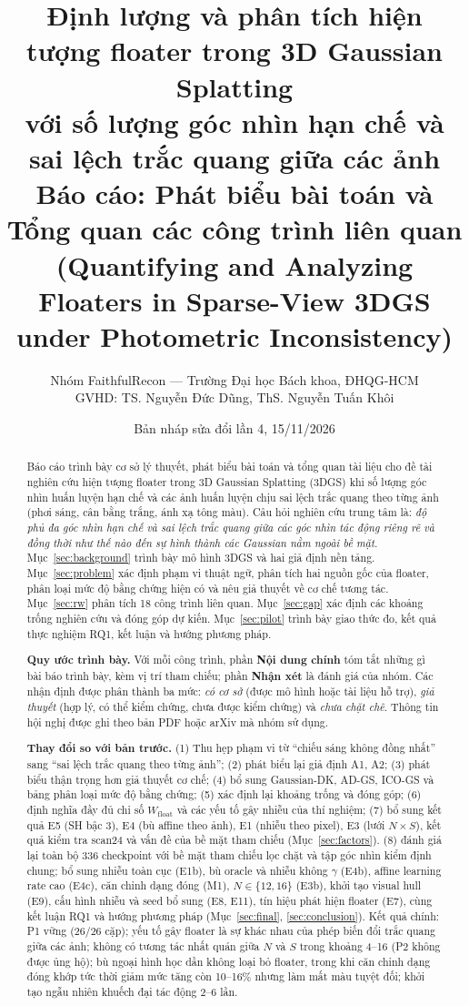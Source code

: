 \documentclass[11pt,a4paper]{article}
\title{\textbf{Định lượng và phân tích hiện tượng floater trong 3D Gaussian Splatting\\với số lượng góc nhìn hạn chế và sai lệch trắc quang giữa các ảnh}\\[4pt]
\large Báo cáo: Phát biểu bài toán và Tổng quan các công trình liên quan\\
\normalsize (Quantifying and Analyzing Floaters in Sparse-View 3DGS under Photometric Inconsistency)}
\author{Nhóm FaithfulRecon --- Trường Đại học Bách khoa, ĐHQG-HCM\\
GVHD: TS. Nguyễn Đức Dũng, ThS. Nguyễn Tuấn Khôi}
\date{Bản nháp sửa đổi lần 4, 15/11/2026}
\begin{document}
\maketitle

\begin{abstract}
\noindent Báo cáo trình bày cơ sở lý thuyết, phát biểu bài toán và tổng quan tài liệu cho đề tài nghiên cứu hiện tượng floater trong 3D Gaussian Splatting (3DGS) khi số lượng góc nhìn huấn luyện hạn chế và các ảnh huấn luyện chịu sai lệch trắc quang theo từng ảnh (phơi sáng, cân bằng trắng, ánh xạ tông màu). Câu hỏi nghiên cứu trung tâm là: \emph{độ phủ đa góc nhìn hạn chế và sai lệch trắc quang giữa các góc nhìn tác động riêng rẽ và đồng thời như thế nào đến sự hình thành các Gaussian nằm ngoài bề mặt.} Mục~\ref{sec:background} trình bày mô hình 3DGS và hai giả định nền tảng. Mục~\ref{sec:problem} xác định phạm vi thuật ngữ, phân tích hai nguồn gốc của floater, phân loại mức độ bằng chứng hiện có và nêu giả thuyết về cơ chế tương tác. Mục~\ref{sec:rw} phân tích 18 công trình liên quan. Mục~\ref{sec:gap} xác định các khoảng trống nghiên cứu và đóng góp dự kiến. Mục~\ref{sec:pilot} trình bày giao thức đo, kết quả thực nghiệm RQ1, kết luận và hướng phương pháp.

\smallskip\noindent\textbf{Quy ước trình bày.} Với mỗi công trình, phần \textcolor{paper}{\textbf{Nội dung chính}} tóm tắt những gì bài báo trình bày, kèm vị trí tham chiếu; phần \textcolor{nhom}{\textbf{Nhận xét}} là đánh giá của nhóm. Các nhận định được phân thành ba mức: \emph{có cơ sở} (được mô hình hoặc tài liệu hỗ trợ), \emph{giả thuyết} (hợp lý, có thể kiểm chứng, chưa được kiểm chứng) và \emph{chưa chặt chẽ}. Thông tin hội nghị được ghi theo bản PDF hoặc arXiv mà nhóm sử dụng.

\smallskip\noindent\textbf{Thay đổi so với bản trước.} (1) Thu hẹp phạm vi từ ``chiếu sáng không đồng nhất'' sang ``sai lệch trắc quang theo từng ảnh''; (2) phát biểu lại giả định A1, A2; (3) phát biểu thận trọng hơn giả thuyết cơ chế; (4) bổ sung Gaussian-DK, AD-GS, ICO-GS và bảng phân loại mức độ bằng chứng; (5) xác định lại khoảng trống và đóng góp; (6) định nghĩa đầy đủ chỉ số $W_{\text{float}}$ và các yếu tố gây nhiễu của thí nghiệm; (7) bổ sung kết quả E5 (SH bậc 3), E4 (bù affine theo ảnh), E1 (nhiễu theo pixel), E3 (lưới $N\times S$), kết quả kiểm tra scan24 và vấn đề của bề mặt tham chiếu (Mục~\ref{sec:factors}). (8) đánh giá lại toàn bộ 336 checkpoint với bề mặt tham chiếu lọc chặt và tập góc nhìn kiểm định chung; bổ sung nhiễu toàn cục (E1b), bù oracle và nhiễu không $\gamma$ (E4b), affine learning rate cao (E4c), căn chỉnh dạng đóng (M1), $N\in\{12,16\}$ (E3b), khởi tạo visual hull (E9), cấu hình nhiễu và seed bổ sung (E8, E11), tín hiệu phát hiện floater (E7), cùng kết luận RQ1 và hướng phương pháp (Mục~\ref{sec:final}, \ref{sec:conclusion}). Kết quả chính: P1 vững (26/26 cặp); yếu tố gây floater là sự khác nhau của phép biến đổi trắc quang giữa các ảnh; không có tương tác nhất quán giữa $N$ và $S$ trong khoảng 4--16 (P2 không được ủng hộ); bù ngoại hình học dần không loại bỏ floater, trong khi căn chỉnh dạng đóng khớp tức thời giảm mức tăng còn 10--16\% nhưng làm mất màu tuyệt đối; khởi tạo ngẫu nhiên khuếch đại tác động 2--6 lần.
\end{abstract}
\end{document}

